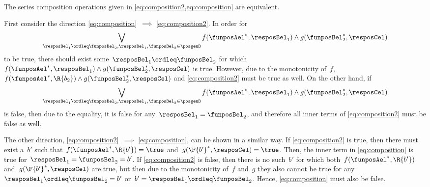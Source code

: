 \begin{remark}
  \label{lem:composition_equivalency}
  The series composition operations given in \cref{eq:composition2,eq:composition} are equivalent.

  First consider the direction \cref{eq:composition}~$\implies$ \cref{eq:composition2}. In order for%
  \begin{equation*}
    \bigvee_{\resposBel_1\ordleq\funposBel_2, \resposBel_1,\funposBel_2\in \posgenB} f(\funposAel^*,\resposBel_1) \wedge g(\funposBel_2^*,\resposCel)%
  \end{equation*}
  to be true, there should exist some~$\resposBel_1\ordleq \funposBel_2$ for which~$f(\funposAel^*,\resposBel_1) \wedge g(\funposBel_2^*,\resposCel)$ is true. However, due to the monotonicity of~$f$,~$f(\funposAel^*,\R{b_2}) \wedge g(\funposBel_2^*,\resposCel)$ and \cref{eq:composition2} must be true as well. On the other hand, if%
  \begin{equation*}
    \bigvee_{\resposBel_1\ordleq\funposBel_2, \resposBel_1,\funposBel_2\in \posgenB} f(\funposAel^*,\resposBel_1) \wedge g(\funposBel_2^*,\resposCel)%
  \end{equation*}
  is false, then due to the equality, it is false for any~$\resposBel_1=\funposBel_2$, and therefore all inner terms of \cref{eq:composition2} must be false as well.

  The other direction, \cref{eq:composition2}~$\implies$ \cref{eq:composition}, can be shown in a similar way. If \cref{eq:composition2} is true, then there must exist a~$b'$ such that~$f(\funposAel^*, \R{b'})=\true$ and~$g(\F{b'}^*, \resposCel)=\true$. Then, the inner term in \cref{eq:composition} is true for~$\resposBel_1=\funposBel_2=b'$. If \cref{eq:composition2} is false, then there is no such~$b'$ for which both~$f(\funposAel^*, \R{b'})$ and~$g(\F{b'}^*, \resposCel)$ are true, but then due to the monotonicity of~$f$ and~$g$ they also cannot be true for any~$\resposBel_1 \ordleq \funposBel_2 = b'$ or~$b'=\resposBel_1 \ordleq \funposBel_2$. Hence, \cref{eq:composition} must also be false.
\end{remark}
